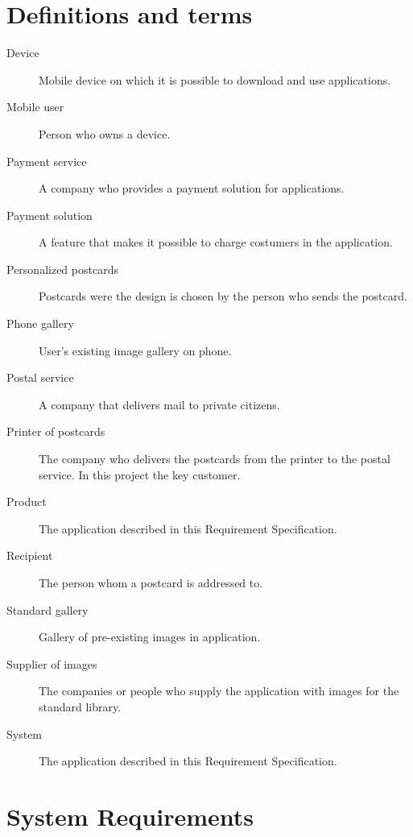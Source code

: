 \documentclass[10pt,a4paper]{article}
\begin{document}

\section{Definitions and terms}
\begin{description}
\item[Device] Mobile device on which it is possible to download and use applications.
\item[Mobile user] Person who owns a device. 
\item[Payment service] A company who provides a payment solution for applications. 
\item[Payment solution] A feature that makes it possible to charge costumers in the application. 

\item[Personalized postcards] Postcards were the design is chosen by the person who sends the postcard. 
\item[Phone gallery] User's existing image gallery on phone.
\item[Postal service] A company that delivers mail to private citizens.
\item[Printer of postcards] The company who delivers the postcards from the printer to the postal service. In this project the key customer.
\item[Product]The application described in this Requirement Specification.
\item[Recipient]The person whom a postcard is addressed to.
\item[Standard gallery] Gallery of pre-existing images in application.
\item[Supplier of images] The companies or people who supply the application with images for the standard library.
\item[System] The application described in this Requirement Specification.
\end{description}

\section{System Requirements}
\end{document}

